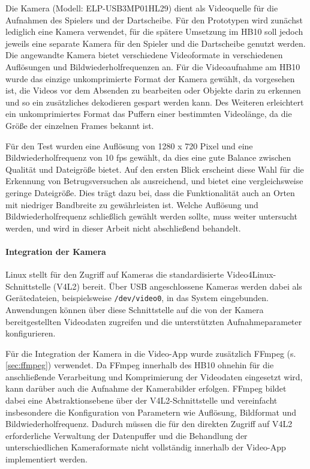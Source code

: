 Die Kamera (Modell:  ELP-USB3MP01HL29)\cite{elp_ar0331_wdr_camera} dient als Videoquelle für die Aufnahmen des Spielers und der Dartscheibe. Für den Prototypen wird zunächst lediglich eine Kamera verwendet, 
für die spätere Umsetzung im HB10 soll jedoch jeweils eine separate Kamera für den Spieler und die Dartscheibe genutzt werden. Die angewandte Kamera bietet verschiedene Videoformate in verschiedenen Auflösungen und Bildwiederholfrequenzen an. Für die Videoaufnahme am HB10 wurde das einzige unkomprimierte Format der Kamera gewählt, 
da vorgesehen ist, die Videos vor dem Absenden zu bearbeiten oder Objekte darin zu erkennen und so ein zusätzliches dekodieren gespart werden kann. Des Weiteren erleichtert ein unkomprimiertes Format das Puffern einer bestimmten Videolänge, da die Größe der einzelnen Frames bekannt ist.

Für den Test wurden eine Auflösung von 1280 x 720 Pixel und eine Bildwiederholfrequenz von 10 fps gewählt, da dies eine gute Balance zwischen Qualität und Dateigröße bietet. Auf den ersten Blick erscheint diese Wahl für die Erkennung von Betrugsversuchen als ausreichend, 
und bietet eine vergleichsweise geringe Dateigröße. Dies trägt dazu bei, dass die Funktionalität auch an Orten mit niedriger Bandbreite zu gewährleisten ist. Welche Auflösung und Bildwiederholfrequenz schließlich gewählt werden sollte, muss weiter untersucht werden, 
und wird in dieser Arbeit nicht abschließend behandelt.

\paragraph{Integration der Kamera}

Linux stellt für den Zugriff auf Kameras die standardisierte Video4Linux-Schnittstelle (V4L2) bereit. Über USB angeschlossene Kameras werden dabei als Gerätedateien, beispielsweise \texttt{/dev/video0}, in das System eingebunden. Anwendungen können über diese Schnittstelle auf die von der Kamera bereitgestellten Videodaten zugreifen und die unterstützten Aufnahmeparameter konfigurieren. 

Für die Integration der Kamera in die Video-App wurde zusätzlich FFmpeg (s. \cref{sec:ffmpeg}) verwendet. Da FFmpeg innerhalb des HB10 ohnehin für die anschließende Verarbeitung und Komprimierung der Videodaten eingesetzt wird, kann darüber auch die Aufnahme der Kamerabilder erfolgen. FFmpeg bildet dabei eine Abstraktionsebene über der V4L2-Schnittstelle und vereinfacht insbesondere die Konfiguration von Parametern wie Auflösung, Bildformat und Bildwiederholfrequenz. Dadurch müssen die für den direkten Zugriff auf V4L2 erforderliche Verwaltung der Datenpuffer und die Behandlung der unterschiedlichen Kameraformate nicht vollständig innerhalb der Video-App implementiert werden.

